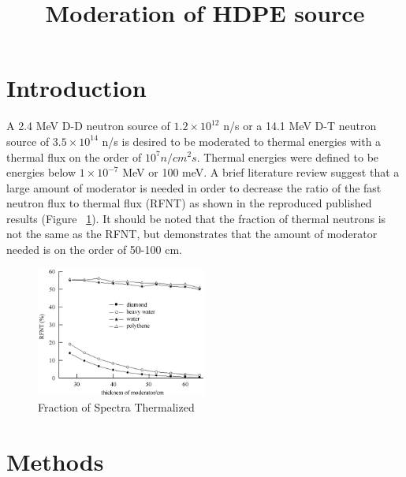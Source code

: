 \documentclass[draftcls,onecolumn]{IEEEtran}
\begin{document}
\title{Moderation of HDPE source}


\maketitle


\IEEEpeerreviewmaketitle

\section{Introduction}
A 2.4 MeV D-D neutron source of $1.2\times 10^{12}$ n/s or a 14.1 MeV D-T neutron source of $3.5\times10^{14}$ n/s is desired to be moderated to thermal energies with a thermal flux on the order of $10^{7} n/cm^2s$.
Thermal energies were defined to be energies below $1\times10^{-7}$ MeV or 100 meV.
A brief literature review suggest that a large amount of moderator is needed  in order to decrease the ratio of the fast neutron flux to thermal flux (RFNT) as shown in the reproduced published results (Figure ~\ref{fig:Fig2Paper}).
It should be noted that the fraction of thermal neutrons is not the same as the RFNT, but demonstrates that the amount of moderator needed is on the order of 50-100 cm.
\begin{figure}
	\centering
\includegraphics[width=0.5\textwidth]{DTModeratorFig2}
\caption{Fraction of Spectra Thermalized}
\label{fig:Fig2Paper}
\end{figure}

\section{Methods}
\end{document}
